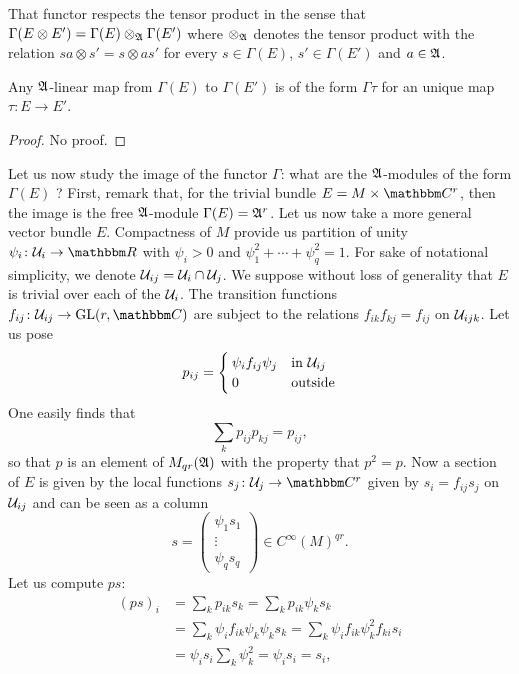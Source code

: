 That functor respects the tensor product in the sense that $\Gamma(E\otimes E')=\Gamma(E)\otimes_{\mathfrak{A}}\Gamma(E')$ where $\otimes_{\mathfrak{A}}$ denotes the tensor product with the relation $sa\otimes s'=s\otimes as'$ for every $s\in\Gamma(E)$, $s'\in\Gamma(E')$ and $a\in\mathfrak{A}$.

\begin{proposition}
Any $\mathfrak{A}$-linear map from $\Gamma(E)$ to $\Gamma(E')$ is of the form $\Gamma\tau$ for an unique map $\tau\colon E\to E'$.
\end{proposition}

\begin{proof}
No proof.
\end{proof}

Let us now study the image of the functor $\Gamma$: what are the $\mathfrak{A}$-modules of the form $\Gamma(E)$ ? First, remark that, for the trivial bundle $E=M\times\eC^r$, then the image is the free $\mathfrak{A}$-module $\Gamma(E)=\mathfrak{A}^r$. Let us now take a more general vector bundle $E$. Compactness of $M$ provide us partition of unity $\psi_i\colon  \mU_i\to \eR$ with $\psi_i>0$ and $\psi_1^2+\cdots+\psi_q^2=1$. For sake of notational simplicity, we denote $\mathcal{U}_{ij}=\mathcal{U}_i\cap\mathcal{U}_j$.  We suppose without loss of generality that $E$ is trivial over each of the $\mathcal{U}_i$. The transition functions $f_{ij}\colon \mU_{ij}\to \GL(r,\eC)$ are subject to the relations $f_{ik}f_{kj}=f_{ij}$ on $\mathcal{U}_{ijk}$. Let us pose
\begin{equation}
 p_{ij}=
\begin{cases}
	\psi_if_{ij}\psi_j&\text{in $\mathcal{U}_{ij}$}\\
	0&\text{outside}
\end{cases}
\end{equation}
One easily finds that
\[ 
  \sum_kp_{ij}p_{kj}=p_{ij},
\]
so that $p$ is an element of $M_{qr}(\mathfrak{A})$ with the property that $p^2=p$. Now a section of $E$ is given by the local functions $s_j\colon \mU_j\to \eC^r$ given by $s_i=f_{ij}s_j$ on $\mathcal{U}_{ij}$ and can be seen as a column
\begin{equation}
s=
\begin{pmatrix}
\psi_1s_1\\\vdots\\\psi_qs_q
\end{pmatrix}\in C^{\infty}(M)^{qr}.
\end{equation}
Let us compute $ps$:
\[ 
\begin{split}
(ps)_i	&=\sum_kp_{ik}s_k
	=\sum_kp_{ik}\psi_ks_k\\
	&=\sum_k\psi_if_{ik}\psi_k\psi_ks_k
	=\sum_k\psi_if_{ik}\psi_k^2f_{ki}s_i\\
	&=\psi_is_i\sum_k\psi_k^2
	=\psi_is_i=s_i,
\end{split}  
\]
